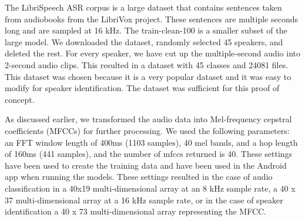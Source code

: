 \documentclass{report}
\theoremstyle{definition}
\theoremstyle{remark}
\begin{document}
The LibriSpeech ASR corpus \cite{7178964} is a large dataset that contains sentences taken from audiobooks from the LibriVox project. These sentences are multiple seconds long and are sampled at 16 kHz. The train-clean-100 is a smaller subset of the large model. We downloaded the dataset, randomly selected 45 speakers, and deleted the rest. For every speaker, we have cut up the multiple-second audio into 2-second audio clips. This resulted in a dataset with 45 classes and 24081 files. This dataset was chosen because it is a very popular dataset and it was easy to modify for speaker identification. The dataset was sufficient for this proof of concept.

As discussed earlier, we transformed the audio data into Mel-frequency cepstral coefficients (MFCCs) for further processing. We used the following parameters: an FFT window length of  400ms (1103 samples), 40 mel bands, and a hop length of 160ms (441 samples), and the number of mfccs returned is 40. These settings have been used to create the training data and have been used in the Android app when running the models. These settings resulted in the case of audio classification in a 40x19 multi-dimensional array at an 8 kHz sample rate, a 40 x 37 multi-dimensional array at a 16 kHz sample rate, or in the case of speaker identification a 40 x 73 multi-dimensional array representing the MFCC.
\end{document}
